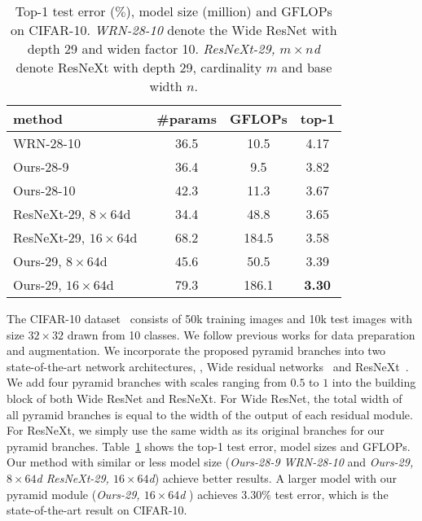 \documentclass[10pt,twocolumn,letterpaper]{article}
\begin{document}
\begin{table}[]
\begin{small}
\centering
\caption{Top-1 test error ($\%$), model size (million) and GFLOPs on CIFAR-10. \textit{WRN-28-10} denote the Wide ResNet with depth 29 and widen factor 10. \textit{ResNeXt-29, $m\times n$d} denote ResNeXt with depth 29, cardinality $m$ and base width $n$. 
}
\label{table:cifar-comparison}
\begin{tabular} {lccc}\hline
method      		& \#params	& GFLOPs 	& top-1 \\
\hline
WRN-28-10~\cite{zagoruyko2016WRN}         	
					& 36.5 		& 10.5		& 4.17         \\   
Ours-28-9        	& 36.4		& 9.5		& 3.82	   	   \\ 
Ours-28-10    		& 42.3 		& 11.3 		& 3.67         \\
\hline  
ResNeXt-29, $8\times 64$d~\cite{xie2016aggregated}
					& 34.4  	& 48.8 		& 3.65        \\   
ResNeXt-29, $16\times 64$d~\cite{xie2016aggregated}  
					& 68.2  	& 184.5 	& 3.58        \\   
Ours-29, $8\times 64$d 		
					& 45.6  	& 50.5		& 3.39        \\ 
Ours-29, $16\times 64$d		
					& 79.3	  	& 186.1		& \textbf{3.30}    	        \\ 
\hline 
\end{tabular}
\end{small}
\vspace{-0.2em}
\end{table}

The CIFAR-10 dataset~\cite{krizhevsky2009learning} consists of 50k training images and 10k test images with size $32 \times 32$ drawn from 10 classes. 
We follow previous works for data preparation and augmentation. 
We incorporate the proposed pyramid branches into two state-of-the-art network architectures, \ie, Wide residual networks~\cite{zagoruyko2016WRN} and ResNeXt~\cite{xie2016aggregated}. 
We add four pyramid branches with scales ranging from $0.5$ to $1$ into the building block of both Wide ResNet and ResNeXt. 
For Wide ResNet, the total width of all pyramid branches is equal to the width of the output of each residual module.   
For ResNeXt, we simply use the same width as its original branches for our pyramid branches. 
Table~\ref{table:cifar-comparison} shows the top-1 test error, model sizes and GFLOPs. 
Our method with similar or less model size (\textit{Ours-28-9 \vs WRN-28-10} and \textit{Ours-29, $8\times 64$d \vs ResNeXt-29, $16\times 64$d}) achieve better results. A larger model with our pyramid module (\textit{Ours-29, $16\times 64$d	}) achieves $3.30\%$ test error, which is the state-of-the-art result on CIFAR-10. 
\end{document}
